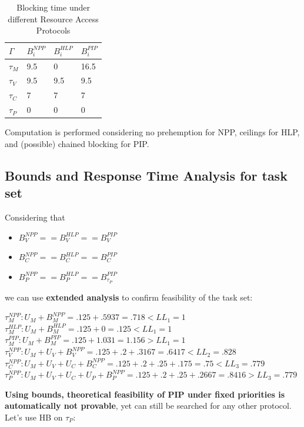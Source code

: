 \documentclass{article}
\begin{document}
\begin{table}[H]
  \label{network_table}
  \centering
  \begin{tabular}{llll}
    $\Gamma$ &    $B_{i}^{NPP}$ & $B_{i}^{HLP}$  & $B_{i}^{PIP}$\\
    \midrule
    $\tau_{M}$ &    9.5  &      0   &           16.5 \\
    $\tau_{V}$ &    9.5 &       9.5 &           9.5\\
    $\tau_{C}$ &    7 &         7 &             7\\
    $\tau_{P}$ &    0 &         0 &             0\\
    \bottomrule
  \end{tabular}
  \medskip{}
  \caption{Blocking time under different Resource Access Protocols}
\end{table}

Computation is performed considering no prehemption for NPP, ceilings for HLP, and (possible) chained blocking for PIP.

\subsection{Bounds and Response Time Analysis for task set}

Considering that

\begin{itemize}
    \item $B_{V}^{NPP} == B_{V}^{HLP} == B_{V}^{PIP}$
    \item $B_{C}^{NPP} == B_{C}^{HLP} == B_{C}^{PIP}$
    \item $B_{P}^{NPP} == B_{P}^{HLP}== B_{\tau_{P}}^{PIP}$
\end{itemize}

we can use \textbf{extended analysis} to confirm feasibility of the task set:

\begin{center}                          \label{llb}
    \medskip{}
    $\tau_{M}^{NPP} : U_{M} + B_{M}^{NPP} = .125 + .5937 = .718 < LL_{1} =1$\\\medskip{}
    $\tau_{M}^{HLP} : U_{M} + B_{M}^{HLP} = .125 + 0 = .125 < LL_{1} =1$\\\medskip{}
    $\tau_{M}^{PIP} : U_{M} + B_{M}^{PIP} = .125 + 1.031 = 1.156 > LL_{1} =1$\\\medskip{}
    $\tau_{V}^{NPP} : U_{M} + U_{V} + B_{V}^{NPP} = .125+ .2+ .3167 = .6417 < LL_{2} =.828$\\\medskip{}
    $\tau_{C}^{NPP} : U_{M} + U_{V} + U_{C} + B_{C}^{NPP} = .125 + .2 + .25 + .175 = .75< LL_{3} =.779$\\\medskip{}
    $\tau_{P}^{NPP} : U_{M} + U_{V} + U_{C} + U_{P} + B_{P}^{NPP} = .125+.2+.25+.2667 = .8416 > LL_{3} =.779$\\\medskip{}
\end{center}
\textbf{Using bounds, theoretical feasibility of PIP under fixed priorities is automatically not provable}, yet can still be searched for any other protocol. Let's use HB on $\tau_{P}$:
\end{document}
